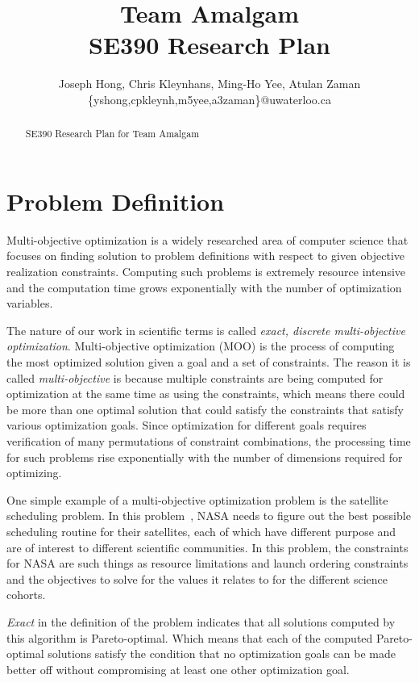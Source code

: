 \documentclass[11pt]{article}
\title{{\Large Team Amalgam} \\ SE390 Research Plan}
\author{Joseph Hong, Chris Kleynhans, Ming-Ho Yee, Atulan Zaman \\
        \{yshong,cpkleynh,m5yee,a3zaman\}@uwaterloo.ca}
\begin{document}
\maketitle

\begin{abstract}
SE390 Research Plan for Team Amalgam
\end{abstract}

\tableofcontents
\newpage

\section{Problem Definition}
Multi-objective optimization is a widely researched area of computer
science that focuses on finding solution to problem definitions with
respect to given objective realization constraints. Computing such
problems is extremely resource intensive and the computation time grows
exponentially with the number of optimization variables.

The nature of our work in scientific terms is called \textit{exact,
discrete multi-objective optimization}. Multi-objective optimization
(MOO) is the process of computing the most optimized solution given a
goal and a set of constraints. The reason it is called
\textit{multi-objective} is because multiple constraints are being
computed for optimization at the same time as using the constraints,
which means there could be more than one optimal solution that could
satisfy the constraints that satisfy various optimization goals. Since
optimization for different goals requires verification of many
permutations of constraint combinations, the processing time for such
problems rise exponentially with the number of dimensions required for
optimizing.

One simple example of a multi-objective optimization problem is the
satellite scheduling problem. In this problem~\cite{ref:decadal}, NASA
needs to figure out the best possible scheduling routine for their
satellites, each of which have different purpose and are of interest to
different scientific communities. In this problem, the constraints for
NASA are such things as resource limitations and launch ordering
constraints and the objectives to solve for the values it relates to
for the different science cohorts.

\textit{Exact} in the definition of the problem indicates that all
solutions computed by this algorithm is Pareto-optimal. Which means
that each of the computed Pareto-optimal solutions satisfy the
condition that no optimization goals can be made better off without
compromising at least one other optimization goal.
\end{document}
